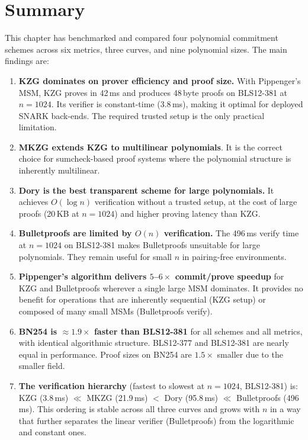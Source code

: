 \section{Summary}
\label{sec:chapter7-summary}

This chapter has benchmarked and compared four polynomial commitment
schemes across six metrics, three curves, and nine polynomial sizes.
The main findings are:

\begin{enumerate}
    \item \textbf{KZG dominates on prover efficiency and proof size.}
          With Pippenger's MSM, KZG proves in 42\,ms and produces
          48\,byte proofs on BLS12-381 at $n = 1024$. Its verifier is
          constant-time (3.8\,ms), making it optimal for deployed
          SNARK back-ends. The required trusted setup is the only
          practical limitation.

    \item \textbf{MKZG extends KZG to multilinear polynomials}. It is the correct choice for sumcheck-based proof systems where the polynomial structure is inherently multilinear.

    \item \textbf{Dory is the best transparent scheme for large
          polynomials.} It achieves $O(\log n)$ verification without a
          trusted setup, at the cost of large proofs (20\,KB at
          $n = 1024$) and higher proving latency than KZG.

    \item \textbf{Bulletproofs are limited by $O(n)$ verification.}
          The 496\,ms verify time at $n = 1024$ on BLS12-381 makes
          Bulletproofs unsuitable for large polynomials. They remain
          useful for small $n$ in pairing-free environments.

    \item \textbf{Pippenger's algorithm delivers $5$--$6\times$
          commit/prove speedup} for KZG and Bulletproofs wherever a
          single large MSM dominates. It provides no benefit for
          operations that are inherently sequential (KZG setup) or
          composed of many small MSMs (Bulletproofs verify).

    \item \textbf{BN254 is $\approx 1.9\times$ faster than BLS12-381}
          for all schemes and all metrics, with identical algorithmic
          structure. BLS12-377 and BLS12-381 are nearly equal in
          performance. Proof sizes on BN254 are $1.5\times$ smaller
          due to the smaller field.

    \item \textbf{The verification hierarchy} (fastest to slowest at
          $n = 1024$, BLS12-381) is:
          KZG (3.8\,ms) $\ll$ MKZG (21.9\,ms) $<$ Dory (95.8\,ms)
          $\ll$ Bulletproofs (496\,ms).
          This ordering is stable across all three curves and grows
          with $n$ in a way that further separates the linear verifier
          (Bulletproofs) from the logarithmic and constant ones.
\end{enumerate}

